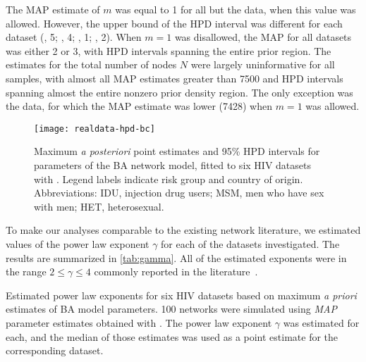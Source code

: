 The MAP estimate of $m$ was equal to 1 for all but the
\citeauthor{novitsky2014impact} data, when this value was allowed. However, the
upper bound of the HPD interval was different for each dataset
  (\citeauthor{niculescu2015recent}, 5;
   \citeauthor{wang2015targeting}, 4;
   \citeauthor{li2015hiv}, 1;
   \citeauthor{cuevas2009hiv}, 2).
When $m = 1$ was disallowed, the MAP for all datasets was either 2 or 3, with
HPD intervals spanning the entire prior region. The estimates for the total
number of nodes $N$ were largely uninformative for all samples, with almost all
MAP estimates greater than 7500 and HPD intervals spanning almost the entire
nonzero prior density region. The only exception was the \citeauthor{li2015hiv}
data, for which the MAP estimate was lower 
  (7428)
when $m = 1$ was allowed.

\begin{figure*}[ht]
  \centering
  \texttt{[image: realdata-hpd-bc]}
  \caption[
      Maximum \textit{a posteriori} point estimates and 95\% HPD intervals for
      parameters of the BA network model, fitted to six HIV datasets
      with .]
  {
      Maximum \textit{a posteriori} point estimates and 95\% HPD intervals for
      parameters of the BA network model, fitted to six HIV datasets with
      . Legend labels indicate risk group and country of
      origin. Abbreviations: IDU, injection drug users; MSM, men who have sex
      with men; HET, heterosexual.
  }
  \label{fig:abchpd}
\end{figure*}

To make our analyses comparable to the existing network literature, we
estimated values of the power law exponent $\gamma$ for each of the datasets 
investigated. The results are summarized in \cref{tab:gamma}. All of the
estimated exponents were in the range $2 \leq \gamma \leq 4$ commonly reported
in the literature~\autocite{liljeros2001web, schneeberger2004scale,
colgate1989risk, brown2011transmission}. 

\begin{table}
    \centering
    
    \caption[
        Estimated power law exponents for six HIV datasets based on maximum
        \textit{a priori} estimates of BA model parameters.
    ]{
        Estimated power law exponents for six HIV datasets based on maximum
        \textit{a priori} estimates of BA model parameters. 100 networks were
        simulated using \textit{MAP} parameter estimates obtained with
        . The power law exponent $\gamma$ was estimated for
        each, and the median of those estimates was used as a point estimate
        for the corresponding dataset.
    }
    \label{tab:gamma}
\end{table}
